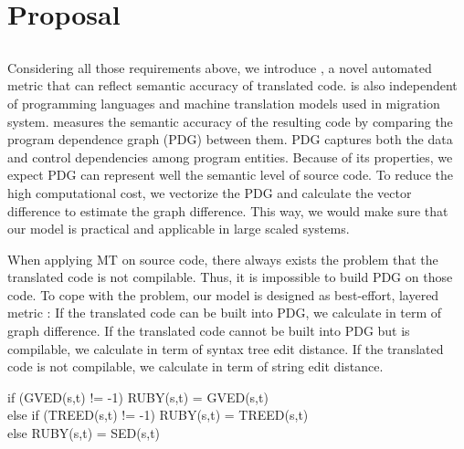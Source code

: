 \section{Proposal}
\subsection{\model}



Considering all those requirements above, we introduce {\model}, a novel automated metric that can reflect semantic accuracy of translated code. {\model} is also independent of programming languages and machine translation models used in migration system. {\model} measures the semantic accuracy of the resulting code by comparing the program dependence graph (PDG) between them. PDG captures both the data and control dependencies among program entities. Because of its properties, we expect PDG can represent well the semantic level of source code. To reduce the high computational cost, we vectorize the PDG and calculate the vector difference to estimate the graph difference. This way, we would make sure that our model is practical and applicable in large scaled systems. 

When applying MT on source code, there always exists the problem that the translated code is not compilable. Thus, it is impossible to build PDG on those code. To cope with the problem, our model is designed as best-effort, layered metric  : If the translated code can be built into PDG, we calculate {\model} in term of graph difference. If the translated code cannot be built into PDG but is compilable, we calculate {\model} in term of syntax tree edit distance. If the translated code is not compilable, we calculate {\model} in term of string edit distance. 

if (GVED(s,t) != -1) RUBY(s,t) = GVED(s,t)\\
else if (TREED(s,t) != -1) RUBY(s,t) = TREED(s,t)\\
else RUBY(s,t) = SED(s,t)